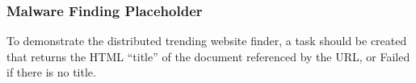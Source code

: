 \subsubsection{Malware Finding Placeholder}
To demonstrate the distributed trending website finder, a task should be created that returns the HTML ``title'' of the document referenced by the URL, or Failed if there is no title.